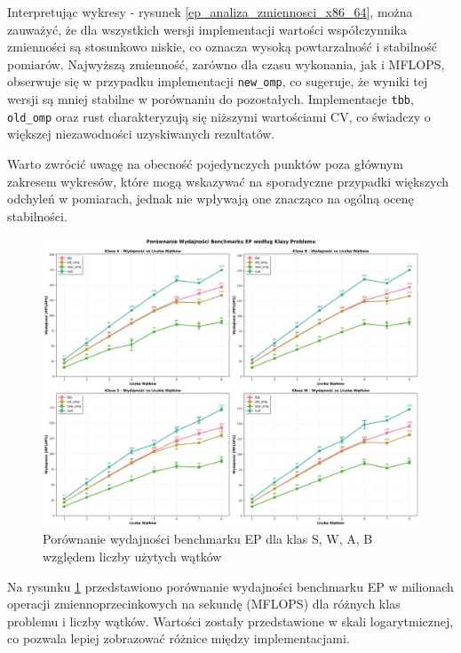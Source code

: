 Interpretując wykresy - rysunek \ref{ep_analiza_zmiennosci_x86_64}, można zauważyć, że dla wszystkich wersji implementacji wartości współczynnika zmienności są stosunkowo niskie, co oznacza wysoką powtarzalność i stabilność pomiarów. Najwyższą zmienność, zarówno dla czasu wykonania, jak i MFLOPS, obserwuje się w przypadku implementacji \texttt{new\_omp}, co sugeruje, że wyniki tej wersji są mniej stabilne w porównaniu do pozostałych. Implementacje \texttt{tbb}, \texttt{old\_omp} oraz rust charakteryzują się niższymi wartościami CV, co świadczy o większej niezawodności uzyskiwanych rezultatów.

Warto zwrócić uwagę na obecność pojedynczych punktów poza głównym zakresem wykresów, które mogą wskazywać na sporadyczne przypadki większych odchyleń w pomiarach, jednak nie wpływają one znacząco na ogólną ocenę stabilności.

\begin{figure}[H]
    \centering
    \includegraphics[width=\textwidth]{analiza/images/parallel/ep/x86/ep_porownanie_wydajnosci.png}
    \caption{Porównanie wydajności benchmarku EP dla klas S, W, A, B względem liczby użytych wątków}
    \label{ep_porownanie_wydajnosci_x86_64}
\end{figure}
Na rysunku \ref{ep_porownanie_wydajnosci_x86_64} przedstawiono porównanie wydajności benchmarku EP w milionach operacji zmiennoprzecinkowych na sekundę (MFLOPS) dla różnych klas problemu i liczby wątków. Wartości zostały przedstawione w skali logarytmicznej, co pozwala lepiej zobrazować różnice między implementacjami.

